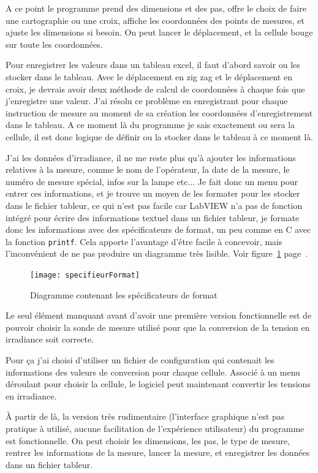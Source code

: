 \documentclass[12pt]{article}
\begin{document}
A ce point le programme prend des dimensions et des pas, offre le choix de faire une cartographie ou une croix, affiche les coordonnées des points de mesures, et ajuste les dimensions si besoin.  
On peut lancer le déplacement, et la cellule bouge sur toute les coordonnées.  

Pour enregistrer les valeurs dans un tableau excel, il faut d'abord savoir ou les stocker dans le tableau.  
Avec le déplacement en zig zag et le déplacement en croix, je devrais avoir deux méthode de calcul de coordonnées à chaque fois que j'enregistre une valeur.  
J'ai résolu ce problème en enregistrant pour chaque instruction de mesure au moment de sa création les coordonnées d'enregistrement dans le tableau. A ce moment là du programme je sais exactement ou sera la cellule, il est donc logique de définir ou la stocker dans le tableau à ce moment là.  

J'ai les données d'irradiance, il ne me reste plus qu'à ajouter les informations relatives à la mesure, comme le nom de l'opérateur, la date de la mesure, le numéro de mesure spécial, infos sur la lampe etc...
Je fait donc un menu pour entrer ces informations, et je trouve un moyen de les formater pour les stocker dans le fichier tableur, ce qui n'est pas facile car LabVIEW n'a pas de fonction intégré pour écrire des informations textuel dans un fichier tableur, je formate donc les informations avec des spécificateurs de format, un peu comme en C avec la fonction \verb|printf|.
Cela apporte l'avantage d'être facile à concevoir, mais l'inconvénient de ne pas produire un diagramme très lisible.
Voir figure~\ref{fig:specifieurFormat} page~\pageref{fig:specifieurFormat}.

\begin{figure}[h]
	\centering
	\texttt{[image: specifieurFormat]}
	\caption{Diagramme contenant les spécificateurs de format}
	\label{fig:specifieurFormat}
\end{figure}

Le seul élément manquant avant d'avoir une première version fonctionnelle est de pouvoir choisir la sonde de mesure utilisé pour que la conversion de la tension en irradiance soit correcte. 

Pour ça j'ai choisi d'utiliser un fichier de configuration qui contenait les informations des valeurs de conversion pour chaque cellule. Associé à un menu déroulant pour choisir la cellule, le logiciel peut maintenant convertir les tensions en irradiance.  

À partir de là, la version très rudimentaire (l'interface graphique n'est pas pratique à utilisé, aucune facilitation de l'expérience utilisateur) du programme est fonctionnelle.
On peut choisir les dimensions, les pas, le type de mesure, rentrer les informations de la mesure, lancer la mesure, et enregistrer les données dans un fichier tableur.
\end{document}
